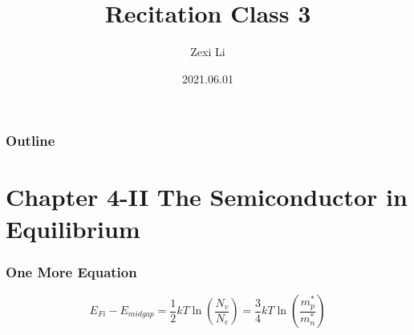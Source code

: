 \documentclass{beamer}
\begin{document}
\renewcommand{\d}{\: \mathrm{d} }
\newcommand{\e}{\mathrm{e}}


\title[] {Recitation Class 3}

\author[lzx]{Zexi Li}


\date{2021.06.01}

\frame{\titlepage}


\begin{frame}
    \frametitle{Outline}
    \tableofcontents
\end{frame}


\section{Chapter 4-II The Semiconductor in Equilibrium}
    \begin{frame} \frametitle{One More Equation}
        \begin{equation*}
            \boxed{E_{Fi} - E_{midgap} = \frac{1}{2} kT \ln \left( \frac{N_v}{N_c}  \right) = \frac{3}{4} kT \ln \left( \frac{m_p^*}{m_n^*}  \right)}
        \end{equation*}
    \end{frame}
\end{document}
